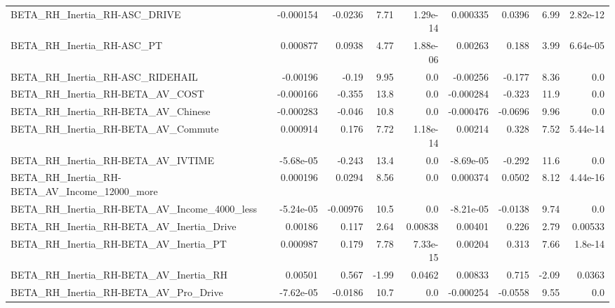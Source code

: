 \begin{tabular}{lrrrrrrrr}
BETA\_RH\_Inertia\_RH-ASC\_DRIVE                       &   -0.000154 &      -0.0236 &     7.71 & 1.29e-14 &   0.000335 &      0.0396 &         6.99 &      2.82e-12 \\
BETA\_RH\_Inertia\_RH-ASC\_PT                          &    0.000877 &       0.0938 &     4.77 & 1.88e-06 &    0.00263 &       0.188 &         3.99 &      6.64e-05 \\
BETA\_RH\_Inertia\_RH-ASC\_RIDEHAIL                    &    -0.00196 &        -0.19 &     9.95 &      0.0 &   -0.00256 &      -0.177 &         8.36 &           0.0 \\
BETA\_RH\_Inertia\_RH-BETA\_AV\_COST                    &   -0.000166 &       -0.355 &     13.8 &      0.0 &  -0.000284 &      -0.323 &         11.9 &           0.0 \\
BETA\_RH\_Inertia\_RH-BETA\_AV\_Chinese                 &   -0.000283 &       -0.046 &     10.8 &      0.0 &  -0.000476 &     -0.0696 &         9.96 &           0.0 \\
BETA\_RH\_Inertia\_RH-BETA\_AV\_Commute                 &    0.000914 &        0.176 &     7.72 & 1.18e-14 &    0.00214 &       0.328 &         7.52 &      5.44e-14 \\
BETA\_RH\_Inertia\_RH-BETA\_AV\_IVTIME                  &   -5.68e-05 &       -0.243 &     13.4 &      0.0 &  -8.69e-05 &      -0.292 &         11.6 &           0.0 \\
BETA\_RH\_Inertia\_RH-BETA\_AV\_Income\_12000\_more       &    0.000196 &       0.0294 &     8.56 &      0.0 &   0.000374 &      0.0502 &         8.12 &      4.44e-16 \\
BETA\_RH\_Inertia\_RH-BETA\_AV\_Income\_4000\_less        &   -5.24e-05 &     -0.00976 &     10.5 &      0.0 &  -8.21e-05 &     -0.0138 &         9.74 &           0.0 \\
BETA\_RH\_Inertia\_RH-BETA\_AV\_Inertia\_Drive           &     0.00186 &        0.117 &     2.64 &  0.00838 &    0.00401 &       0.226 &         2.79 &       0.00533 \\
BETA\_RH\_Inertia\_RH-BETA\_AV\_Inertia\_PT              &    0.000987 &        0.179 &     7.78 & 7.33e-15 &    0.00204 &       0.313 &         7.66 &       1.8e-14 \\
BETA\_RH\_Inertia\_RH-BETA\_AV\_Inertia\_RH              &     0.00501 &        0.567 &    -1.99 &   0.0462 &    0.00833 &       0.715 &        -2.09 &        0.0363 \\
BETA\_RH\_Inertia\_RH-BETA\_AV\_Pro\_Drive               &   -7.62e-05 &      -0.0186 &     10.7 &      0.0 &  -0.000254 &     -0.0558 &         9.55 &           0.0 \\

\end{tabular}
